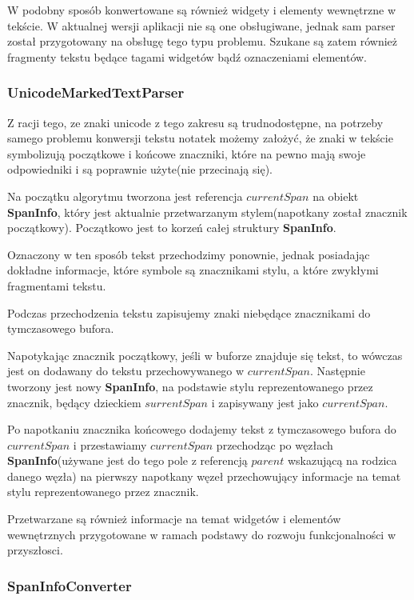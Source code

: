 W podobny sposób konwertowane są również widgety i elementy wewnętrzne w tekście. W aktualnej wersji aplikacji nie są one obsługiwane, jednak sam parser został przygotowany na obsługę tego typu problemu. Szukane są zatem również fragmenty tekstu będące tagami widgetów bądź oznaczeniami elementów.

\subsubsection{UnicodeMarkedTextParser}

Z racji tego, ze znaki unicode z tego zakresu są trudnodostępne, na potrzeby samego problemu konwersji tekstu notatek możemy założyć, że znaki w tekście symbolizują początkowe i końcowe znaczniki, które na pewno mają swoje odpowiedniki i są poprawnie użyte(nie przecinają się).

Na początku algorytmu tworzona jest referencja $currentSpan$ na obiekt \textbf{SpanInfo}, który jest aktualnie przetwarzanym stylem(napotkany został znacznik początkowy). Początkowo jest to korzeń całej struktury \textbf{SpanInfo}.

Oznaczony w ten sposób tekst przechodzimy ponownie, jednak posiadając dokładne informacje, które symbole są znacznikami stylu, a które zwykłymi fragmentami tekstu.

Podczas przechodzenia tekstu zapisujemy znaki niebędące znacznikami do tymczasowego bufora.

Napotykając znacznik początkowy, jeśli w buforze znajduje się tekst, to wówczas jest on dodawany do tekstu przechowywanego w $currentSpan$. Następnie tworzony jest nowy \textbf{SpanInfo}, na podstawie stylu reprezentowanego przez znacznik, będący dzieckiem $surrentSpan$ i zapisywany jest jako $currentSpan$. 

Po napotkaniu znacznika końcowego dodajemy tekst z tymczasowego bufora do $currentSpan$ i przestawiamy $currentSpan$ przechodząc po węzłach \textbf{SpanInfo}(używane jest do tego pole z referencją $parent$ wskazującą na rodzica danego węzła) na pierwszy napotkany węzeł przechowujący informacje na temat stylu reprezentowanego przez znacznik.

Przetwarzane są również informacje na temat widgetów i elementów wewnętrznych przygotowane w ramach podstawy do rozwoju funkcjonalności w przyszłosci.

\subsubsection{SpanInfoConverter}

